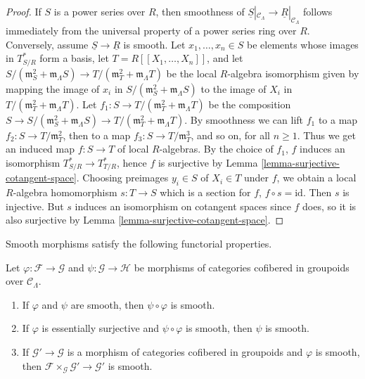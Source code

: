 \begin{proof}
If $S$ is a power series over $R$, then smoothness of $\underline{S}|_{\mathcal 
C_\Lambda} \to \underline{R}|_{\mathcal{C}_\Lambda}$ follows 
immediately from the universal property of a power series ring over $R$.  
Conversely, assume $\underline{S} \to \underline{R}$ is smooth.  Let 
$x_1, \dots, x_n \in S$ be elements whose images in $T^*_{S/R}$ form a basis, 
let $T = R[[X_1, \dots, X_n]]$, and let $S/(\mathfrak{m}_S^2 + 
\mathfrak{m}_\Lambda S) \to T/(\mathfrak{m}_T^2 + 
\mathfrak{m}_\Lambda T)$ be the local $R$-algebra isomorphism given by mapping 
the image of $x_i$ in $S/(\mathfrak{m}_S^2 + \mathfrak{m}_\Lambda S)$ to the 
image of $X_i$ in $T/(\mathfrak{m}_T^2 + \mathfrak{m}_\Lambda T)$.  Let $f_1: 
S \to T/(\mathfrak{m}_T^2 + \mathfrak{m}_\Lambda T)$ be the 
composition $S \to S/(\mathfrak{m}_S^2 + \mathfrak{m}_\Lambda S) 
\to T/(\mathfrak{m}_T^2 + \mathfrak{m}_\Lambda T)$.  By smoothness we 
can lift $f_1$ to a map $f_2: S \to T/\mathfrak{m}_T^2$, then to a map 
$f_3: S \to T/\mathfrak{m}_T^3$, and so on, for all $n \geq 1$.  Thus 
we get an induced map $f: S \to T$ of local $R$-algebras.  By the 
choice of $f_1$, $f$ induces an isomorphism $T^*_{S/R} \to T^*_{T/R}$, 
hence $f$ is surjective by Lemma \ref{lemma-surjective-cotangent-space}.  
Choosing preimages $y_i \in S$ of $X_i \in T$ under $f$, we obtain a local 
$R$-algebra homomorphism $s: T \to S$ which is a section for $f$, $f 
\circ s = \text{id}$. Then $s$ is injective. But $s$ induces an 
isomorphism on cotangent spaces since $f$ does, so it is also surjective by 
Lemma \ref{lemma-surjective-cotangent-space}. 
\end{proof}

\noindent
Smooth morphisms satisfy the following functorial properties.

\begin{lemma}
\label{lemma-smooth-properties}
Let $\varphi: \mathcal{F} \to \mathcal G$ and $\psi: \mathcal G 
\to \mathcal H$ be morphisms of categories cofibered in groupoids over 
$\mathcal{C}_\Lambda$.
\begin{enumerate}
\item If $\varphi$ and $\psi$ are smooth, then $\psi \circ \varphi$ is smooth.
\item If $\varphi$ is essentially surjective and $\psi \circ \varphi$ is 
smooth, then $\psi$ is smooth.
\item If $\mathcal G' \to \mathcal G$ is a morphism of categories 
cofibered in groupoids and $\varphi$ is smooth, then $\mathcal{F} 
\times_{\mathcal G} \mathcal G' \to \mathcal G'$ is smooth.
\end{enumerate}
\end{lemma} 


